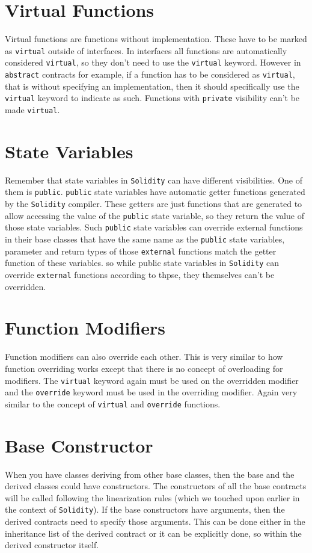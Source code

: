 \section{Virtual Functions}
Virtual functions are functions without implementation. These have to be marked as \verb|virtual| outside of interfaces. In interfaces all functions are automatically considered \verb|virtual|, so they don't need to use the \verb|virtual| keyword. However in \verb|abstract| contracts for example, if a function has to be considered as \verb|virtual|, that is without specifying an implementation, then it should specifically use the \verb|virtual| keyword to indicate as such. Functions with \verb|private| visibility can't be made \verb|virtual|.

\section{State Variables}
Remember that state variables in \verb|Solidity| can have different visibilities. One of them is \verb|public|. \verb|public| state variables have automatic getter functions generated by the \verb|Solidity| compiler. These getters are just functions that are generated to allow accessing the value of the \verb|public| state variable, so they return the value of those state variables. Such \verb|public| state variables can override external functions in their base classes that have the same name as the \verb|public| state variables, parameter and return types of those \verb|external| functions match the getter function of these variables. so while public state variables in \verb|Solidity| can override \verb|external| functions according to thpse, they themselves can't be overridden.

\section{Function Modifiers}
Function modifiers can also override each other. This is very similar to how function overriding works except that there is no concept of overloading for modifiers. The \verb|virtual| keyword again must be used on the overridden modifier and the \verb|override| keyword must be used in the overriding modifier. Again very similar to the concept of \verb|virtual| and \verb|override| functions.

\section{Base Constructor}
When you have classes deriving from other base classes, then the base and the derived classes could have constructors. The constructors of all the base contracts will be called following the linearization rules (which we touched upon earlier in the context of \verb|Solidity|). If the base constructors have arguments, then the derived contracts need to specify those arguments. This can be done either in the inheritance list of the derived contract or it can be explicitly done, so within the derived constructor itself.

